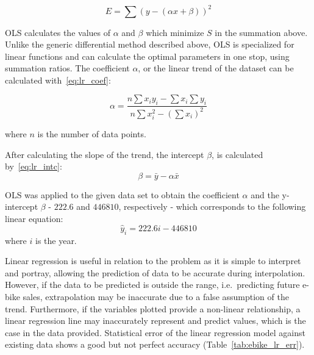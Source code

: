 \begin{equation}
    E = \sum{(y - (\alpha x + \beta))^2}
    \label{eq:ls_lr}
\end{equation}

OLS calculates the values of $\alpha$ and $\beta$ which minimize $S$ in the summation above.
Unlike the generic differential method described above, OLS is specialized for linear functions and can calculate the optimal parameters in one stop, using summation ratios.
The coefficient $\alpha$, or the linear trend of the dataset can be calculated with~\eqref{eq:lr_coef}:

\begin{equation}
    \alpha = \frac{n \sum x_i y_i - \sum x_i \sum y_i }{n \sum x^2_i - (\sum x_i)^2}
    \label{eq:lr_coef}
\end{equation}

\noindent where $n$ is the number of data points.

After calculating the slope of the trend, the intercept $\beta$, is calculated by~\eqref{eq:lr_intc}:
%
\begin{equation}
    \beta = \bar y - \alpha \bar x
    \label{eq:lr_intc}
\end{equation}

OLS was applied to the given data set to obtain the coefficient $\alpha$ and the y-intercept $\beta$ - $222.6$ and $446810$, respectively - which corresponds to the following linear equation:
%
\begin{equation}
    \hat y_i = 222.6 i - 446810
    \label{eq:ebike_lr}
\end{equation}
%
\noindent where $i$ is the year.

Linear regression is useful in relation to the problem as it is simple to interpret and portray, allowing the prediction of data to be accurate during interpolation.
However, if the data to be predicted is outside the range, i.e.\ predicting future e-bike sales, extrapolation may be inaccurate due to a false assumption of the trend.
Furthermore, if the variables plotted provide a non-linear relationship, a linear regression line may inaccurately represent and predict values, which is the case in the data provided.
Statistical error of the linear regression model against existing data shows a good but not perfect accuracy (Table~\ref{tab:ebike_lr_err}).

